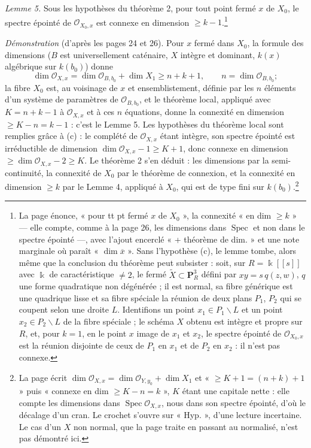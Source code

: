\documentclass[11pt,a4paper]{article}
\begin{document}
\emph{Lemme 5.} Sous les hypothèses du théorème 2, pour tout point fermé $x$
de $X_0$, le spectre épointé de $\mathcal{O}_{X_0,x}$ est connexe en dimension
$\geq k - 1$.\footnote{La page énonce, « pour tt pt fermé $x$ de $X_0$ », la
connexité « en dim $\geq k$ » --- elle compte, comme à la page 26, les
dimensions dans $\operatorname{Spec}$ et non dans le spectre épointé ---, avec
l'ajout encerclé « + théorème de dim. » et une note marginale où paraît
« $\dim \overline{x}$ ». Sans l'hypothèse (c), le lemme tombe, alors même
que la conclusion du théorème peut subsister : soit, sur $R = \Bbbk[[s]]$ avec
$\Bbbk$ de caractéristique $\neq 2$, le fermé $\widetilde{X} \subset
\mathbf{P}^3_R$ défini par $xy = s\,q(z, w)$, $q$ une forme quadratique non dégénérée ; il est
normal, sa fibre générique est une quadrique lisse et sa fibre spéciale la
réunion de deux plans $P_1$, $P_2$ qui se coupent selon une droite $L$.
Identifions un point $x_1 \in P_1 \smallsetminus L$ et un point $x_2 \in P_2
\smallsetminus L$ de la fibre spéciale ; le schéma $X$ obtenu est intègre et
propre sur $R$, et, pour $k = 1$, en le point $x$ image de $x_1$ et $x_2$, le
spectre épointé de $\mathcal{O}_{X_0,x}$ est la réunion disjointe de ceux de
$P_1$ en $x_1$ et de $P_2$ en $x_2$ : il n'est pas connexe.}

\emph{Démonstration} (d'après les pages 24 et 26). Pour $x$ fermé dans $X_0$,
la formule des dimensions ($B$ est universellement caténaire, $X$ intègre et
dominant, $k(x)$ algébrique sur $k(b_0)$) donne
\[
  \dim \mathcal{O}_{X,x} = \dim \mathcal{O}_{B,b_0} + \dim X_1 \geq n + k + 1,
  \qquad n = \dim \mathcal{O}_{B,b_0} ;
\]
la fibre $X_0$ est, au voisinage de $x$ et ensemblistement, définie par les $n$
éléments d'un système de paramètres de $\mathcal{O}_{B,b_0}$, et le théorème
local, appliqué avec $K = n + k - 1$ à $\mathcal{O}_{X,x}$ et à ces $n$
équations, donne la connexité en dimension $\geq K - n = k - 1$ : c'est le
Lemme 5. Les hypothèses du théorème local sont remplies grâce à (c) : le
complété de $\mathcal{O}_{X,x}$ étant intègre, son spectre épointé est
irréductible de dimension $\dim \mathcal{O}_{X,x} - 1 \geq K + 1$, donc
connexe en dimension $\geq \dim \mathcal{O}_{X,x} - 2 \geq K$. Le théorème 2
s'en déduit : les dimensions par la semi-continuité, la connexité de $X_0$ par
le théorème de connexion, et la connexité en dimension $\geq k$ par le
Lemme 4, appliqué à $X_0$, qui est de type fini sur $k(b_0)$.\footnote{La page
écrit $\dim \mathcal{O}_{X,x} = \dim \mathcal{O}_{Y,y_0} + \dim X_1$ et
« $\geq K+1 = (n+k)+1$ » puis « connexe en dim $\geq K - n = k$ », $K$
étant une capitale nette : elle compte les dimensions dans
$\operatorname{Spec} \mathcal{O}_{X,x}$, nous dans son spectre épointé, d'où
le décalage d'un cran. Le crochet s'ouvre sur « Hyp. », d'une lecture
incertaine. Le cas d'un $X$ non normal, que la page traite en passant au
normalisé, n'est pas démontré ici.}
\end{document}
